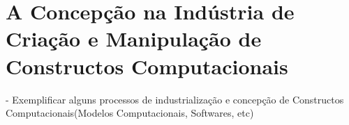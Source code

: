 \chapter{A Concepção na Indústria de Criação e Manipulação de Constructos Computacionais}\label{cap:concepcao_industria}

- Exemplificar alguns processos de industrialização e concepção de Constructos Computacionais(Modelos Computacionais, Softwares, etc)